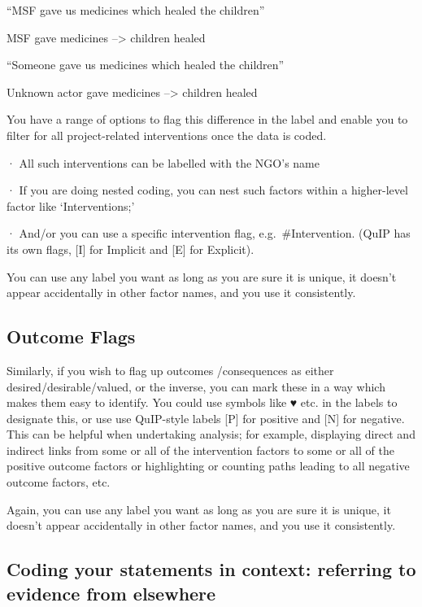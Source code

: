 \documentclass[
]{book}
\begin{document}
``MSF gave us medicines which healed the children''

MSF gave medicines --\textgreater{} children healed

``Someone gave us medicines which healed the children''

Unknown actor gave medicines --\textgreater{} children healed

You have a range of options to flag this difference in the label and enable you to filter for all project-related interventions once the data is coded.

· All such interventions can be labelled with the NGO's name

· If you are doing nested coding, you can nest such factors within a higher-level factor like `Interventions;'

· And/or you can use a specific intervention flag, e.g.~\#Intervention. (QuIP has its own flags, {[}I{]} for Implicit and {[}E{]} for Explicit).

You can use any label you want as long as you are sure it is unique, it doesn't appear accidentally in other factor names, and you use it consistently.

\hypertarget{outcome-flags}{%
\subsection{Outcome Flags}\label{outcome-flags}}

Similarly, if you wish to flag up outcomes /consequences as either desired/desirable/valued, or the inverse, you can mark these in a way which makes them easy to identify. You could use symbols like ♥ etc. in the labels to designate this, or use use QuIP-style labels {[}P{]} for positive and {[}N{]} for negative. This can be helpful when undertaking analysis; for example, displaying direct and indirect links from some or all of the intervention factors to some or all of the positive outcome factors or highlighting or counting paths leading to all negative outcome factors, etc.

Again, you can use any label you want as long as you are sure it is unique, it doesn't appear accidentally in other factor names, and you use it consistently.

\hypertarget{coding-your-statements-in-context-referring-to-evidence-from-elsewhere}{%
\subsection{Coding your statements in context: referring to evidence from elsewhere}\label{coding-your-statements-in-context-referring-to-evidence-from-elsewhere}}
\end{document}
